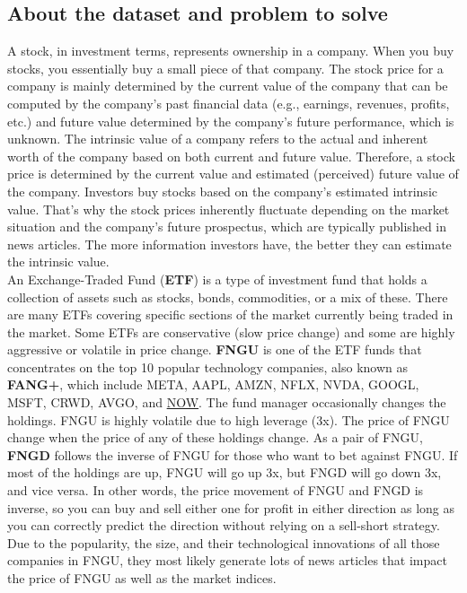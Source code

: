 \documentclass[twocolumn,10pt]{article}
\begin{document}
\begin{multicols}{2}
\begin{flushleft}
\subsection*{About the dataset and problem to solve}
A stock, in investment terms, represents ownership in a company. When you buy stocks, you essentially buy a small piece of that company. The stock price for a company is mainly determined by the current value of the company that can be computed by the company’s past financial data (e.g., earnings, revenues, profits, etc.) and future value determined by the company’s future performance, which is unknown. The intrinsic value of a company refers to the actual and inherent worth of the company based on both current and future value. Therefore, a stock price is determined by the current value and estimated (perceived) future value of the company. Investors buy stocks based on the company’s estimated intrinsic value. That’s why the stock prices inherently fluctuate depending on the market situation and the company’s future prospectus, which are typically published in news articles. The more information investors have, the better they can estimate the intrinsic value.\\
An Exchange-Traded Fund (\textbf{ETF}) is a type of investment fund that holds a collection of assets such as stocks, bonds, commodities, or a mix of these. There are many ETFs covering specific sections of the market currently being traded in the market. Some ETFs are conservative (slow price change) and some are highly aggressive or volatile in price change. \textbf{FNGU} is one of the ETF funds that concentrates on the top 10 popular technology companies, also known as \textbf{FANG+}, which include META, AAPL, AMZN, NFLX, NVDA, GOOGL, MSFT, CRWD, AVGO, and \href{https://finance.yahoo.com/quote/FNGU/holdings/}{NOW}. The fund manager occasionally changes the holdings. FNGU is highly volatile due to high leverage (3x). The price of FNGU change when the price of any of these holdings change. As a pair of FNGU, \textbf{FNGD} follows the inverse of FNGU for those who want to bet against FNGU. If most of the holdings are up, FNGU will go up 3x, but FNGD will go down 3x, and vice versa. In other words, the price movement of FNGU and FNGD is inverse, so you can buy and sell either one for profit in either direction as long as you can correctly predict the direction without relying on a sell-short strategy. Due to the popularity, the size, and their technological innovations of all those companies in FNGU, they most likely generate lots of news articles that impact the price of FNGU as well as the market indices.\\

\end{flushleft}
\end{multicols}
\end{document}
